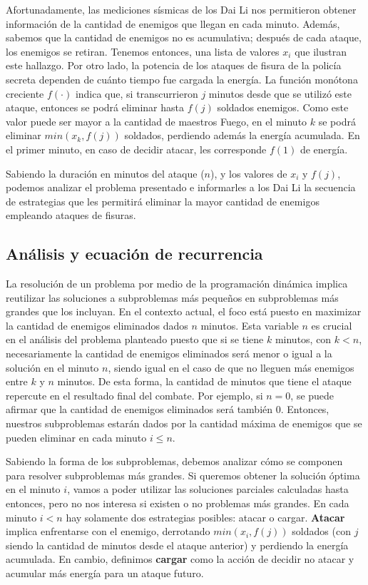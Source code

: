 \documentclass{article}
\begin{document}
Afortunadamente, las mediciones sísmicas de los Dai Li nos permitieron obtener información de la cantidad de enemigos que llegan en cada minuto. Además, sabemos que la cantidad de enemigos no es acumulativa; después de cada ataque, los enemigos se retiran. Tenemos entonces, una lista de valores $x_i$ que ilustran este hallazgo. Por otro lado, la potencia de los ataques de fisura de la policía secreta dependen de cuánto tiempo fue cargada la energía. La función monótona creciente $f(\cdot)$ indica que, si transcurrieron $j$ minutos desde que se utilizó este ataque, entonces se podrá eliminar hasta  $f(j)$ soldados enemigos. Como este valor puede ser mayor a la cantidad de maestros Fuego, en el minuto $k$ se podrá eliminar $min(x_k, f(j))$ soldados, perdiendo además la energía acumulada. En el primer minuto, en caso de decidir atacar, les corresponde $f(1)$ de energía.

Sabiendo la duración en minutos del ataque ($n$), y los valores de $x_i$ y $f(j)$, podemos analizar el problema presentado e informarles a los Dai Li la secuencia de estrategias que les permitirá eliminar la mayor cantidad de enemigos empleando ataques de fisuras.

\subsection{Análisis y ecuación de recurrencia}
\label{sec:analisis}

La resolución de un problema por medio de la programación dinámica implica reutilizar las soluciones a subproblemas más pequeños en subproblemas más grandes que los incluyan. En el contexto actual, el foco está puesto en maximizar la cantidad de enemigos eliminados dados $n$ minutos. Esta variable $n$ es crucial en el análisis del problema planteado puesto que si se tiene $k$ minutos, con $k < n$, necesariamente la cantidad de enemigos eliminados será menor o igual a la solución en el minuto $n$, siendo igual en el caso de que no lleguen más enemigos entre $k$ y $n$ minutos. De esta forma, la cantidad de minutos que tiene el ataque repercute en el resultado final del combate. Por ejemplo, si $n = 0$, se puede afirmar que la cantidad de enemigos eliminados será también 0. Entonces, nuestros subproblemas estarán dados por la cantidad máxima de enemigos que se pueden eliminar en cada minuto $i \leq n$.

Sabiendo la forma de los subproblemas, debemos analizar cómo se componen para resolver subproblemas más grandes. Si queremos obtener la solución óptima en el minuto $i$, vamos a poder utilizar las soluciones parciales calculadas hasta entonces, pero no nos interesa si existen o no problemas más grandes. En cada minuto $i < n$ hay solamente dos estrategias posibles: atacar o cargar. \textbf{Atacar} implica enfrentarse con el enemigo, derrotando $min(x_i, f(j))$ soldados (con $j$ siendo la cantidad de minutos desde el ataque anterior) y perdiendo la energía acumulada. En cambio, definimos \textbf{cargar} como la acción de decidir no atacar y acumular más energía para un ataque futuro. 
\end{document}
